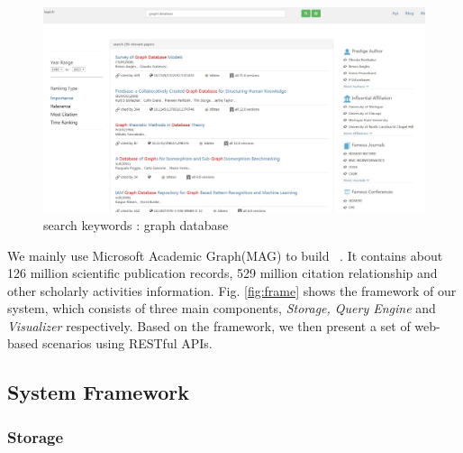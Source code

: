 \begin{figure}[tp]
\centering
\includegraphics[width=\textwidth]{searchKeywords110.pdf}
\caption{search keywords : graph database}
\label{fig: search keywords}
\end{figure}

\par
We mainly use Microsoft Academic Graph(MAG) to build \oursystem ~\cite{sinha2015overview}. It contains about 126 million scientific publication records, 529 million citation relationship and other scholarly activities information. Fig. \ref{fig:frame} shows the framework of our system, which consists of three main components, \emph{Storage, Query Engine} and \emph{Visualizer} respectively. Based on the framework, we then present a set of web-based scenarios using RESTful APIs.

\subsection{System Framework}

\subsubsection{Storage}
\par

